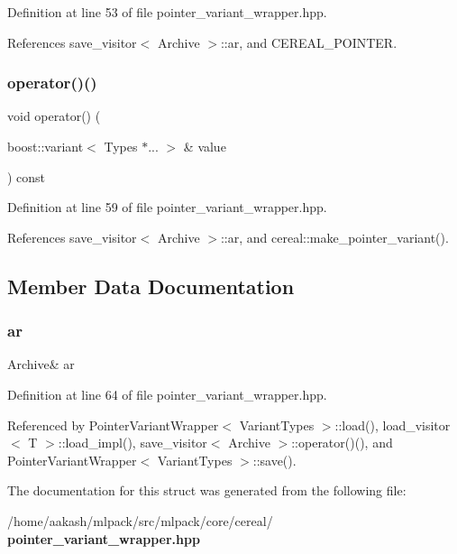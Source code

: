 Definition at line 53 of file pointer\+\_\+variant\+\_\+wrapper.\+hpp.



References save\+\_\+visitor$<$ Archive $>$\+::ar, and C\+E\+R\+E\+A\+L\+\_\+\+P\+O\+I\+N\+T\+ER.

\mbox{\label{structcereal_1_1save__visitor_ac6ad85740cee791e6f711c836fea607d}} 
\subsubsection{operator()()\hspace{0.1cm}{\footnotesize\ttfamily [2/2]}}
{\footnotesize\ttfamily void operator() (\begin{DoxyParamCaption}\item[{boost\+::variant$<$ Types $\ast$... $>$ \&}]{value }\end{DoxyParamCaption}) const\hspace{0.3cm}{\ttfamily [inline]}}



Definition at line 59 of file pointer\+\_\+variant\+\_\+wrapper.\+hpp.



References save\+\_\+visitor$<$ Archive $>$\+::ar, and cereal\+::make\+\_\+pointer\+\_\+variant().



\subsection{Member Data Documentation}
\mbox{\label{structcereal_1_1save__visitor_a35bf67c5eb3a02c7ca3d0db5bebd4e11}} 
\subsubsection{ar}
{\footnotesize\ttfamily Archive\& ar}



Definition at line 64 of file pointer\+\_\+variant\+\_\+wrapper.\+hpp.



Referenced by Pointer\+Variant\+Wrapper$<$ Variant\+Types $>$\+::load(), load\+\_\+visitor$<$ T $>$\+::load\+\_\+impl(), save\+\_\+visitor$<$ Archive $>$\+::operator()(), and Pointer\+Variant\+Wrapper$<$ Variant\+Types $>$\+::save().



The documentation for this struct was generated from the following file\+:\begin{DoxyCompactItemize}
\item 
/home/aakash/mlpack/src/mlpack/core/cereal/\textbf{ pointer\+\_\+variant\+\_\+wrapper.\+hpp}\end{DoxyCompactItemize}
